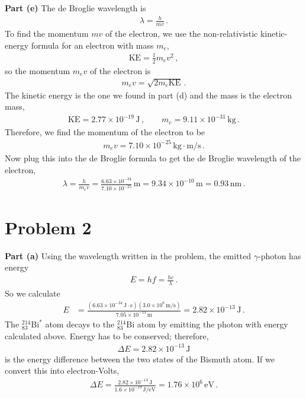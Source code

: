\documentclass[11pt]{article}
\begin{document}
\noindent\textbf{Part (e)} The de Broglie wavelength is
\begin{align*}
\lambda = \frac{h}{mv}\,.
\end{align*}
To find the momentum $mv$ of the electron, we use the non-relativistic kinetic-energy formula for an electron with mass $m_e$, 
\begin{align*}
\text{KE} = \frac{1}{2}m_ev^2\,,
\end{align*}
so the momentum $m_ev$ of the electron is
\begin{align*}
m_ev = \sqrt{2m_e\text{KE}}\,.
\end{align*}
The kinetic energy is the one we found in part (d) and the mass is the electron mass,
\begin{align*}
\text{KE} = 2.77\times 10^{-19}\,\text{J}\,,\qquad
m_e = 9.11\times 10^{-31}\,\text{kg}\,.
\end{align*}
Therefore, we find the momentum of the electron to be
\begin{align*}
m_ev = 7.10\times 10^{-25}\,\text{kg}\cdot\text{m/s}\,.
\end{align*}
Now plug this into the de Broglie formula to get the de Broglie wavelength of the electron,
\begin{align*}
\lambda = \frac{h}{m_ev}=\frac{6.63\times 10^{-34}}{7.10\times 10^{-25}}\,\text{m}
= 9.34\times 10^{-10}\,\text{m}= 0.93\,\text{nm}\,.
\end{align*}


\section*{Problem 2}

\noindent\textbf{Part (a)} Using the wavelength written in the problem, the emitted $\gamma$-photon has energy
\begin{align*}
E = hf = \frac{hc}{\lambda}\,.
\end{align*}
So we calculate
\begin{align*}
E &= \frac{(6.63\times 10^{-34}\,\text{J}\cdot \text{s})(3.0\times 10^8\,\text{m/s})}{7.05\times 10^{-13}\,\text{m}}= 2.82\times 10^{-13}\,\text{J}\,.
\end{align*}
The $^{214}_{83}\text{Bi}^*$ atom decays to the $^{214}_{83}\text{Bi}$ atom by emitting the photon with energy calculated above. Energy has to be conserved; therefore,
\begin{align*}
\Delta E = 2.82\times 10^{-13}\,\text{J}
\end{align*}
is the energy difference between the two states of the Bismuth atom. If we convert this into electron-Volts,
\begin{align*}
\Delta E = \frac{2.82\times 10^{-13}\,\text{J}}{1.6\times 10^{-19}\,\text{J/eV}}
= 1.76\times 10^6\,\text{eV}\,.
\end{align*}
\end{document}
